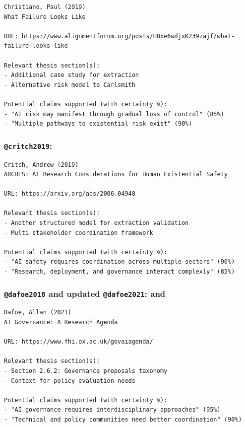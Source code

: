 \documentclass[
  11pt,
  letterpaper,
]{book}
\begin{document}
\begin{verbatim}
Christiano, Paul (2019)
What Failure Looks Like

URL: https://www.alignmentforum.org/posts/HBxe6wdjxK239zajf/what-failure-looks-like

Relevant thesis section(s):
- Additional case study for extraction
- Alternative risk model to Carlsmith

Potential claims supported (with certainty %):
- "AI risk may manifest through gradual loss of control" (85%)
- "Multiple pathways to existential risk exist" (90%)
\end{verbatim}

\subsubsection*{\texorpdfstring{\texttt{@critch2019}:
\textcite{critch2019}}{@critch2019: @critch2019}}\label{critch2019-critch2019}

\begin{verbatim}
Critch, Andrew (2019)
ARCHES: AI Research Considerations for Human Existential Safety

URL: https://arxiv.org/abs/2006.04948

Relevant thesis section(s):
- Another structured model for extraction validation
- Multi-stakeholder coordination framework

Potential claims supported (with certainty %):
- "AI safety requires coordination across multiple sectors" (90%)
- "Research, deployment, and governance interact complexly" (85%)
\end{verbatim}

\subsubsection*{\texorpdfstring{\texttt{@dafoe2018} and updated
\texttt{@dafoe2021}: \textcite{dafoe2021} and
\textcite{dafoe2018}}{@dafoe2018 and updated @dafoe2021: @dafoe2021 and @dafoe2018}}\label{dafoe2018-and-updated-dafoe2021-dafoe2021-and-dafoe2018}

\begin{verbatim}
Dafoe, Allan (2021)
AI Governance: A Research Agenda

URL: https://www.fhi.ox.ac.uk/govaiagenda/

Relevant thesis section(s):
- Section 2.6.2: Governance proposals taxonomy
- Context for policy evaluation needs

Potential claims supported (with certainty %):
- "AI governance requires interdisciplinary approaches" (95%)
- "Technical and policy communities need better coordination" (90%)
\end{verbatim}
\end{document}
